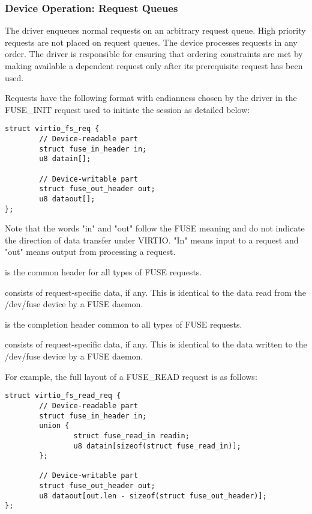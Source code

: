 \subsubsection{Device Operation: Request Queues}\label{sec:Device Types / File System Device / Device Operation / Device Operation: Request Queues}

The driver enqueues normal requests on an arbitrary request queue. High
priority requests are not placed on request queues.  The device processes
requests in any order.  The driver is responsible for ensuring that ordering
constraints are met by making available a dependent request only after its
prerequisite request has been used.

Requests have the following format with endianness chosen by the driver in the
FUSE\_INIT request used to initiate the session as detailed below:

\begin{lstlisting}
struct virtio_fs_req {
        // Device-readable part
        struct fuse_in_header in;
        u8 datain[];

        // Device-writable part
        struct fuse_out_header out;
        u8 dataout[];
};
\end{lstlisting}

Note that the words "in" and "out" follow the FUSE meaning and do not indicate
the direction of data transfer under VIRTIO.  "In" means input to a request and
"out" means output from processing a request.

 is the common header for all types of FUSE requests.

 consists of request-specific data, if any.  This is identical to
the data read from the /dev/fuse device by a FUSE daemon.

 is the completion header common to all types of FUSE requests.

 consists of request-specific data, if any.  This is identical
to the data written to the /dev/fuse device by a FUSE daemon.

For example, the full layout of a FUSE\_READ request is as follows:

\begin{lstlisting}
struct virtio_fs_read_req {
        // Device-readable part
        struct fuse_in_header in;
        union {
                struct fuse_read_in readin;
                u8 datain[sizeof(struct fuse_read_in)];
        };

        // Device-writable part
        struct fuse_out_header out;
        u8 dataout[out.len - sizeof(struct fuse_out_header)];
};
\end{lstlisting}

